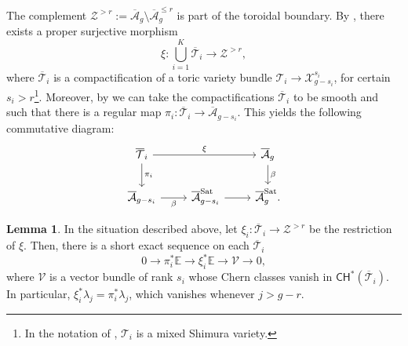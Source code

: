 \documentclass[11pt]{article}
\def\CH{\mathsf{CH}}
\def\Abar{\overline{\mathcal{A}}}
\theoremstyle{definition}
\newtheorem{lemma}[definition]{Lemma}
\begin{document}
The complement $\mathcal Z^{> r} := \overline{\mathcal A}_g\setminus \overline{\mathcal A}_g^{\leq r}$ is part of the toroidal boundary. By \cite[Section 7]{Pinkthesis}, there exists a proper surjective morphism
$$
\xi:\bigcup_{i=1}^K\overline{\mathcal T}_i \to \mathcal Z^{> r},
$$
where $\overline{\mathcal T}_i$ is a compactification of a toric variety bundle $\mathcal T_i \to \mathcal X_{g-s_i}^{s_i}$, for certain $s_i> r$\footnote{In the notation of \cite{Pinkthesis}, $\mathcal T_i$ is a mixed Shimura variety.}. Moreover, by \cite[Proposition 6.25, Proposition 6.26]{Pinkthesis} we can take the compactifications $\overline{\mathcal T}_i$ to be smooth and such that there is a regular map $\pi_i:\overline{\mathcal T}_i \to \overline{\mathcal A}_{g-s_i}$. This yields the following commutative diagram:
\begin{equation}\label{eq:Satake}
\begin{tikzcd}
	\overline{\mathcal T}_i && \Abar_g \\
	\Abar_{g-s_i} & {\Abar^\mathrm{Sat}_{g-s_i}} & {\Abar^\mathrm{Sat}_g}.
	\arrow["\xi", from=1-1, to=1-3]
	\arrow["\pi_i",from=1-1, to=2-1]
	\arrow["\beta", from=1-3, to=2-3]
	\arrow["\beta"', from=2-1, to=2-2]
	\arrow[from=2-2, to=2-3]
\end{tikzcd}
\end{equation}
\begin{lemma}\label{lem:lambdacomp}
    In the situation described above, let $\xi_i :\overline{\mathcal T}_i \to \mathcal Z^{> r}$ be the restriction of $\xi$. Then, there is a short exact sequence on each $\overline{\mathcal T}_i$
    $$
    0 \to \pi_i^* \mathbb E \to \xi_i^*\mathbb E \to \mathcal V \to 0,
    $$
    where $\mathcal V$ is a vector bundle of rank $s_i$ whose Chern classes vanish in $\CH^*(\overline{\mathcal T}_i)$. In particular, $\xi_i^*\lambda_j = \pi_i^*\lambda_j$, which vanishes whenever $j > g-r$.
\end{lemma}
\end{document}
